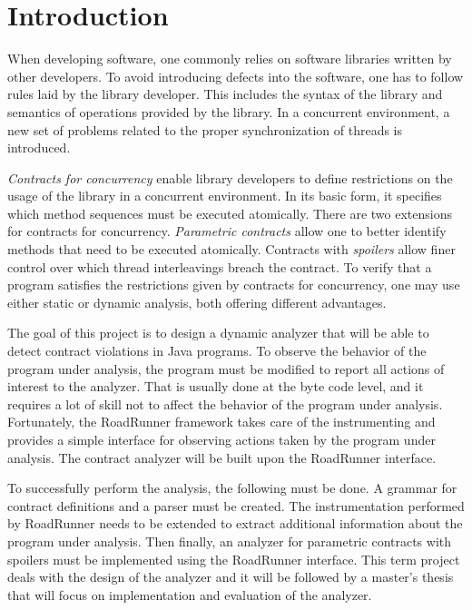 
\chapter{Introduction}

When developing software, one commonly relies on software libraries written by
other developers. To avoid introducing defects into the software, one has to
follow rules laid by the library developer. This includes the syntax of the
library and semantics of operations provided by the library. In a concurrent
environment, a new set of problems related to the proper synchronization of
threads is introduced.

\emph{Contracts for concurrency} enable library developers to define
restrictions on the usage of the library in a concurrent environment. In its
basic form, it specifies which method sequences must be executed atomically.
There are two extensions for contracts for concurrency. \emph{Parametric
contracts} allow one to better identify methods that need to be executed
atomically.  Contracts with \emph{spoilers} allow finer control over which
thread interleavings breach the contract. To verify that a program satisfies the
restrictions given by contracts for concurrency, one may use either static or
dynamic analysis, both offering different advantages.

The goal of this project is to design a dynamic analyzer that will be able to
detect contract violations in Java programs. To observe the behavior of the
program under analysis, the program must be modified to report all actions of
interest to the analyzer. That is usually done at the byte code level, and it
requires a lot of skill not to affect the behavior of the program under
analysis. Fortunately, the RoadRunner framework takes care of the instrumenting
and provides a simple interface for observing actions taken by the program under
analysis. The contract analyzer will be built upon the RoadRunner interface.

To successfully perform the analysis, the following must be done. A grammar for
contract definitions and a parser must be created. The instrumentation performed
by RoadRunner needs to be extended to extract additional information about the
program under analysis. Then finally, an analyzer for parametric contracts with
spoilers must be implemented using the RoadRunner interface. This term project
deals with the design of the analyzer and it will be followed by a master's
thesis that will focus on implementation and evaluation of the analyzer.

